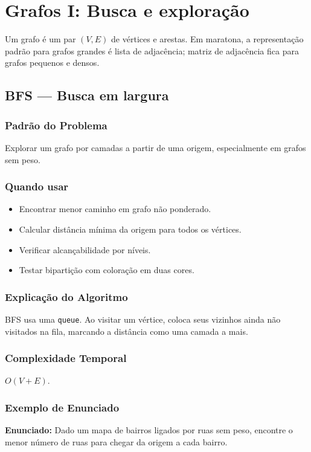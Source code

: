 \chapter{Grafos I: Busca e exploração}

\noindent Um grafo é um par $(V,E)$ de vértices e arestas. Em maratona, a representação padrão para grafos grandes é lista de adjacência; matriz de adjacência fica para grafos pequenos e densos.

\section{BFS --- Busca em largura}

\subsection{Padrão do Problema}
Explorar um grafo por camadas a partir de uma origem, especialmente em grafos sem peso.

\subsection{Quando usar}
\begin{itemize}[nosep]
  \item Encontrar menor caminho em grafo não ponderado.
  \item Calcular distância mínima da origem para todos os vértices.
  \item Verificar alcançabilidade por níveis.
  \item Testar bipartição com coloração em duas cores.
\end{itemize}

\subsection{Explicação do Algoritmo}
BFS usa uma \texttt{queue}. Ao visitar um vértice, coloca seus vizinhos ainda não visitados na fila, marcando a distância como uma camada a mais.

\subsection{Complexidade Temporal}
$O(V + E)$.

\subsection{Exemplo de Enunciado}
\begin{exemplodiabox}
\textbf{Enunciado:} Dado um mapa de bairros ligados por ruas sem peso, encontre o menor número de ruas para chegar da origem a cada bairro.
\end{exemplodiabox}

